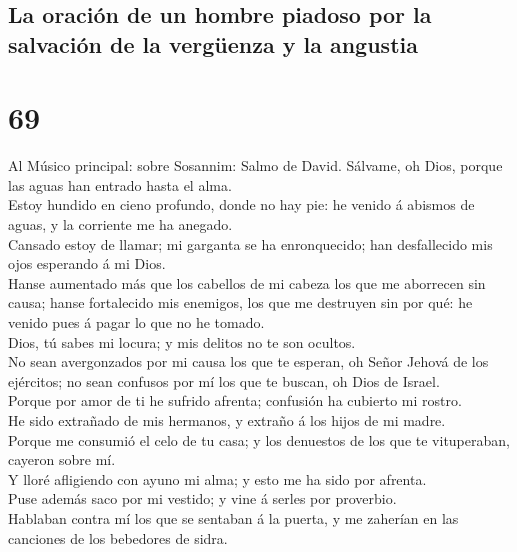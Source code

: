 \hypertarget{la-oraciuxf3n-de-un-hombre-piadoso-por-la-salvaciuxf3n-de-la-verguxfcenza-y-la-angustia}{%
\subsection{La oración de un hombre piadoso por la salvación de la
vergüenza y la
angustia}\label{la-oraciuxf3n-de-un-hombre-piadoso-por-la-salvaciuxf3n-de-la-verguxfcenza-y-la-angustia}}

\hypertarget{section-68}{%
\section{69}\label{section-68}}

 Al Músico principal: sobre Sosannim: Salmo de David.
Sálvame, oh Dios, porque las aguas han entrado hasta el alma.\\
 Estoy hundido en cieno profundo, donde no hay pie: he
venido á abismos de aguas, y la corriente me ha anegado.\\
 Cansado estoy de llamar; mi garganta se ha enronquecido;
han desfallecido mis ojos esperando á mi Dios.\\
 Hanse aumentado más que los cabellos de mi cabeza los que
me aborrecen sin causa; hanse fortalecido mis enemigos, los que me
destruyen sin por qué: he venido pues á pagar lo que no he tomado.\\
 Dios, tú sabes mi locura; y mis delitos no te son
ocultos.\\
 No sean avergonzados por mi causa los que te esperan, oh
Señor Jehová de los ejércitos; no sean confusos por mí los que te
buscan, oh Dios de Israel.\\
 Porque por amor de ti he sufrido afrenta; confusión ha
cubierto mi rostro.\\
 He sido extrañado de mis hermanos, y extraño á los hijos
de mi madre.\\
 Porque me consumió el celo de tu casa; y los denuestos de
los que te vituperaban, cayeron sobre mí.\\
 Y lloré afligiendo con ayuno mi alma; y esto me ha sido
por afrenta.\\
 Puse además saco por mi vestido; y vine á serles por
proverbio.\\
 Hablaban contra mí los que se sentaban á la puerta, y me
zaherían en las canciones de los bebedores de sidra.\\
